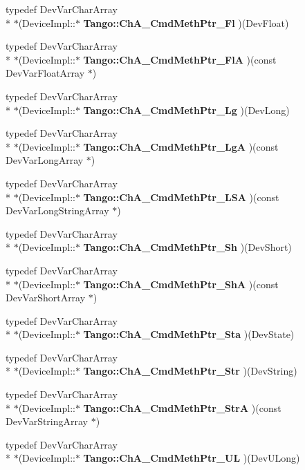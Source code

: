 \begin{DoxyCompactItemize}
\item 
typedef Dev\-Var\-Char\-Array \\*
$\ast$(Device\-Impl\-::$\ast$ {\bf Tango\-::\-Ch\-A\-\_\-\-Cmd\-Meth\-Ptr\-\_\-\-Fl} )(Dev\-Float)
\item 
typedef Dev\-Var\-Char\-Array \\*
$\ast$(Device\-Impl\-::$\ast$ {\bf Tango\-::\-Ch\-A\-\_\-\-Cmd\-Meth\-Ptr\-\_\-\-Fl\-A} )(const Dev\-Var\-Float\-Array $\ast$)
\item 
typedef Dev\-Var\-Char\-Array \\*
$\ast$(Device\-Impl\-::$\ast$ {\bf Tango\-::\-Ch\-A\-\_\-\-Cmd\-Meth\-Ptr\-\_\-\-Lg} )(Dev\-Long)
\item 
typedef Dev\-Var\-Char\-Array \\*
$\ast$(Device\-Impl\-::$\ast$ {\bf Tango\-::\-Ch\-A\-\_\-\-Cmd\-Meth\-Ptr\-\_\-\-Lg\-A} )(const Dev\-Var\-Long\-Array $\ast$)
\item 
typedef Dev\-Var\-Char\-Array \\*
$\ast$(Device\-Impl\-::$\ast$ {\bf Tango\-::\-Ch\-A\-\_\-\-Cmd\-Meth\-Ptr\-\_\-\-L\-S\-A} )(const Dev\-Var\-Long\-String\-Array $\ast$)
\item 
typedef Dev\-Var\-Char\-Array \\*
$\ast$(Device\-Impl\-::$\ast$ {\bf Tango\-::\-Ch\-A\-\_\-\-Cmd\-Meth\-Ptr\-\_\-\-Sh} )(Dev\-Short)
\item 
typedef Dev\-Var\-Char\-Array \\*
$\ast$(Device\-Impl\-::$\ast$ {\bf Tango\-::\-Ch\-A\-\_\-\-Cmd\-Meth\-Ptr\-\_\-\-Sh\-A} )(const Dev\-Var\-Short\-Array $\ast$)
\item 
typedef Dev\-Var\-Char\-Array \\*
$\ast$(Device\-Impl\-::$\ast$ {\bf Tango\-::\-Ch\-A\-\_\-\-Cmd\-Meth\-Ptr\-\_\-\-Sta} )(Dev\-State)
\item 
typedef Dev\-Var\-Char\-Array \\*
$\ast$(Device\-Impl\-::$\ast$ {\bf Tango\-::\-Ch\-A\-\_\-\-Cmd\-Meth\-Ptr\-\_\-\-Str} )(Dev\-String)
\item 
typedef Dev\-Var\-Char\-Array \\*
$\ast$(Device\-Impl\-::$\ast$ {\bf Tango\-::\-Ch\-A\-\_\-\-Cmd\-Meth\-Ptr\-\_\-\-Str\-A} )(const Dev\-Var\-String\-Array $\ast$)
\item 
typedef Dev\-Var\-Char\-Array \\*
$\ast$(Device\-Impl\-::$\ast$ {\bf Tango\-::\-Ch\-A\-\_\-\-Cmd\-Meth\-Ptr\-\_\-\-U\-L} )(Dev\-U\-Long)
\item 

\end{DoxyCompactItemize}
